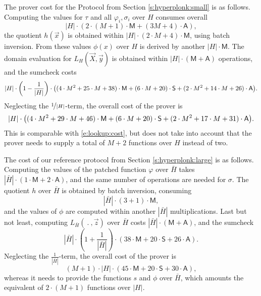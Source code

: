 \documentclass[11pt]{article}
\theoremstyle{definition}
\theoremstyle{definition}
\begin{document}
The prover cost for the Protocol from Section \ref{s:hyperplonk:small} is as follows.
Computing the values for $\tau$ and all $\varphi_i,  \sigma_i$ over $H$ consumes overall
\[
|H|\cdot (2\cdot(M+1)\cdot \mathsf M + (3 M+ 4)\cdot \mathsf A),
\]
the quotient $h(\vec x)$ is obtained within $|H|\cdot (2\cdot M + 4)\cdot\mathsf M$, using batch inversion.
From these values $\phi(x)$ over $H$ is derived by another  $|H|\cdot \mathsf M$.
The domain evaluation for $L_H(\vec X, \vec y)$ is obtained within $|H|\cdot (\mathsf M + \mathsf A)$ operations, and the sumcheck costs
\begin{equation*}
|H| \cdot \left(1-\frac{1}{|H|}\right)\cdot \big((4\cdot M^2 + 25\cdot M + 38)\cdot \mathsf M +  (6\cdot M + 20)\cdot\textsf S + (2\cdot M^2 + 14\cdot M + 26) \cdot \textsf A\big).
\end{equation*}
Neglecting the $\nicefrac{1}{|H|}$-term, the overall cost of the prover is 
\begin{equation}
\label{e:hyperplonk:cost}
|H| \cdot  \big((4\cdot M^2 + 29\cdot M + 46)\cdot \mathsf M +  (6\cdot M + 20)\cdot\textsf S + (2\cdot M^2 + 17\cdot M + 31) \cdot \textsf A\big).
\end{equation}
This is comparable with \eqref{e:lookup:cost}, but does not take into account that the prover needs to supply a total of $M+2$ functions over $H$ instead of two. 


The cost of our reference protocol from Section \ref{s:hyperplonk:large} is as follows.
Computing the values of the patched function $\varphi$  over $\bar H$ takes $|\bar H |\cdot (1\cdot \mathsf M + 2\cdot \mathsf A)$,
and the same number of operations are needed for $\sigma$.
The quotient $h$ over $\bar H$ is obtained by batch inversion, consuming
\[
|\bar H|\cdot (3 + 1) \cdot \mathsf M,
\]
and the values of $\phi$ are computed within another $|\bar H|$ multiplications.
Last but not least, computing $L_{\bar H}(\:.\:, \vec z)$ over $\bar H$ costs $|\bar H|\cdot (\mathsf M + \mathsf A)$, and the sumcheck 
\[
|\bar H| \cdot \left(1 + \frac{1}{|\bar H|}\right) \cdot (38 \cdot \mathsf M + 20 \cdot \mathsf S + 26\cdot\mathsf A).
\] 
Neglecting the $\frac{1}{|\bar H|}$-term, the overall cost of the prover is
\begin{equation}
\label{e:hyperplonk:large:cost}
(M+1)\cdot |H| \cdot (45 \cdot \mathsf M + 20 \cdot \mathsf S + 30\cdot\mathsf A),
\end{equation}
whereas it needs to provide the functions $s$ and $\phi$ over $\bar H$, which amounts the equivalent of $2\cdot (M+1)$ functions over $|H|$.
\end{document}
